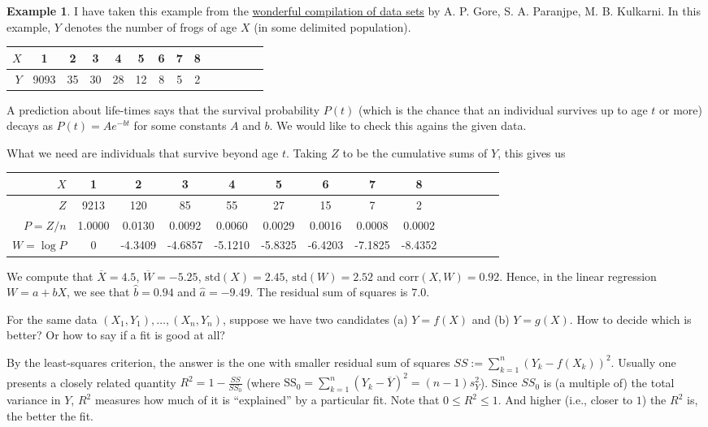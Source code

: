 \documentclass[preprint,  11pt]{amsart}
\newcommand{\parag}[1]{\vspace{4mm}\noindent{\bfseries #1}}
\theoremstyle{plain} %
\theoremstyle{definition} %
\newtheorem{example}[theorem]{Example}
\begin{document}
\begin{example} I have taken this example from the \href{http://ces.iisc.ernet.in/hpg/nvjoshi/statspunedatabook/databook.html}{ wonderful compilation of data sets} by A. P. Gore, S. A. Paranjpe, M. B. Kulkarni. In this example, $Y$ denotes the number of frogs of age $X$ (in some delimited population). 
\begin{center}
\begin{tabular}{||r|c|c|c|c|c|c|c|c|c|c|c|c|c||}
\hline
$X$  & 1 & 2 & 3 & 4 & 5 & 6 & 7 & 8  \\
\hline
$Y$  & 9093 & 35 & 30 & 28 & 12 & 8 & 5 & 2\\
\hline
\hline
\end{tabular}
\end{center}
A prediction about life-times says that the survival probability $P(t)$ (which is the chance that an individual survives up to age $t$ or more) decays as $P(t)=Ae^{-bt}$ for some constants $A$ and $b$. We would like to check this agains the given data.

What we need are individuals that survive beyond age $t$. Taking $Z$ to be the cumulative sums of $Y$, this gives us
\begin{center}
\begin{tabular}{||r|c|c|c|c|c|c|c|c|c|c|c|c|c||}
\hline
$X$  & 1 & 2 & 3 & 4 & 5 & 6 & 7 & 8  \\
\hline
$Z$  & 9213 &  120 & 85 & 55 & 27 & 15 & 7 & 2\\
\hline
$P=Z/n$ & 1.0000  &  0.0130 &   0.0092  &  0.0060  &  0.0029  &  0.0016  &  0.0008  &  0.0002 \\
\hline
$W=\log P$ &  0  & -4.3409  & -4.6857 &  -5.1210  & -5.8325  & -6.4203 &  -7.1825 &  -8.4352 \\
\hline
\hline
\end{tabular}
\end{center}
We compute that $\overline{X}=4.5$, $\overline{W}=-5.25$, $\mbox{std}(X)=2.45$, $\mbox{std}(W)= 2.52$ and $\mbox{corr}(X,W)=0.92$. Hence, in the linear regression $W=a+bX$, we see that $\hat{b}=0.94$ and $\hat{a}=-9.49$. The residual sum of squares is $7.0$. 
\end{example}

\parag{How good is the fit?} For the same data $(X_{1},Y_{1}),\ldots ,(X_{n},Y_{n})$, suppose we have two candidates \; (a) \; $Y=f(X)$ and \; (b) \; $Y=g(X)$. How to decide which is better? Or how to say if a fit is good at all? 

By the least-squares criterion, the answer is  the one with smaller residual sum of squares $SS:=\sum_{k=1}^{n}(Y_{k}-f(X_{k}))^{2}$. Usually one presents a closely related quantity $R^{2}=1-\frac{SS}{SS_{0}}$ (where $\mbox{SS}_{0}=\sum_{k=1}^{n}(Y_{k}-\overline{Y})^{2}=(n-1)s_{Y}^{2}$). Since $SS_{0}$ is (a multiple of) the total variance in $Y$, $R^{2}$ measures how much of it is ``explained'' by a particular fit. Note that $0\le R^{2}\le 1$. And higher (i.e., closer to $1$) the $R^{2}$ is, the better the fit.
\end{document}
